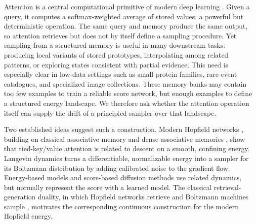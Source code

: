 
Attention is a central computational primitive of modern deep learning
\cite{vaswaniAttentionAllYou2017}. Given a query, it computes a
softmax-weighted average of stored values, a powerful but deterministic
operation. The same query and memory produce the same output, so attention
retrieves but does not by itself define a sampling procedure. Yet sampling from
a structured memory is useful in many downstream tasks: producing local
variants of stored prototypes, interpolating among related patterns, or
exploring states consistent with partial evidence. This need is especially
clear in low-data settings such as small protein families, rare-event
catalogues, and specialized image collections. These memory banks may contain
too few examples to train a reliable score network, but enough examples to
define a structured energy landscape. We therefore ask whether the attention
operation itself can supply the drift of a principled sampler over that
landscape.

Two established ideas suggest such a construction. Modern Hopfield networks
\cite{ramsauerHopfieldNetworksAll2021}, building on classical associative
memory \cite{hopfieldNeuralNetworksPhysical1982} and dense associative memories
\cite{krotovDenseAssociativeMemory2016,krotovLargeAssociativeMemory2021}, show
that tied-key/value attention is related to descent on a smooth, confining
energy. Langevin dynamics
\cite{robertsTweedieExponentialConvergence1996,wellingBayesianLearningStochastic2011,durmusNonasymptoticAnalysisUnadjusted2017}
turns a differentiable, normalizable energy into a sampler for its Boltzmann
distribution by adding calibrated noise to the gradient flow. Energy-based
models \cite{lecunTutorialEnergyBased2006,songHowTrainEnergyBased2021} and
score-based diffusion methods
\cite{songGenerativeModelingEstimating2019,songScoreBasedGenerativeModeling2021}
use related dynamics, but normally represent the score with a learned model.
The classical retrieval-generation duality, in which Hopfield networks retrieve
and Boltzmann machines sample
\cite{ackleyLearningAlgorithmBoltzmann1985}, motivates the corresponding
continuous construction for the modern Hopfield energy.


